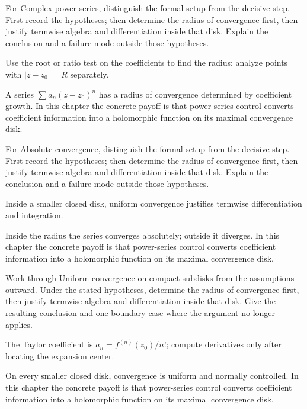 \begin{exercise}\label{exr:iv03-01}
For Complex power series, distinguish the formal setup from the decisive step. First record the hypotheses; then determine the radius of convergence first, then justify termwise algebra and differentiation inside that disk. Explain the conclusion and a failure mode outside those hypotheses.
\end{exercise}
\begin{hint}
Use the root or ratio test on the coefficients to find the radius; analyze points with \(|z-z_0|=R\) separately.
\end{hint}
\begin{solution}
A series $\sum a_n(z-z_0)^n$ has a radius of convergence determined by coefficient growth. In this chapter the concrete payoff is that power-series control converts coefficient information into a holomorphic function on its maximal convergence disk.
\end{solution}

\begin{exercise}\label{exr:iv03-02}
For Absolute convergence, distinguish the formal setup from the decisive step. First record the hypotheses; then determine the radius of convergence first, then justify termwise algebra and differentiation inside that disk. Explain the conclusion and a failure mode outside those hypotheses.
\end{exercise}
\begin{hint}
Inside a smaller closed disk, uniform convergence justifies termwise differentiation and integration.
\end{hint}
\begin{solution}
Inside the radius the series converges absolutely; outside it diverges. In this chapter the concrete payoff is that power-series control converts coefficient information into a holomorphic function on its maximal convergence disk.
\end{solution}

\begin{exercise}\label{exr:iv03-03}
Work through Uniform convergence on compact subdisks from the assumptions outward. Under the stated hypotheses, determine the radius of convergence first, then justify termwise algebra and differentiation inside that disk. Give the resulting conclusion and one boundary case where the argument no longer applies.
\end{exercise}
\begin{hint}
The Taylor coefficient is \(a_n=f^{(n)}(z_0)/n!\); compute derivatives only after locating the expansion center.
\end{hint}
\begin{solution}
On every smaller closed disk, convergence is uniform and normally controlled. In this chapter the concrete payoff is that power-series control converts coefficient information into a holomorphic function on its maximal convergence disk.
\end{solution}


